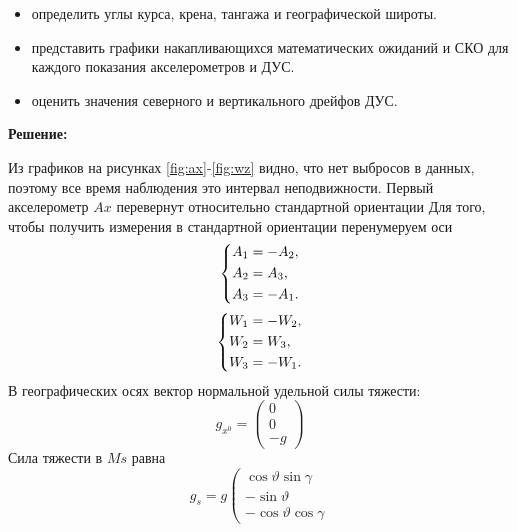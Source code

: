 \documentclass[a4paper,14pt]{article}
\theoremstyle{plain} %
\theoremstyle{definition} %
\theoremstyle{remark} %
\begin{document}
{\begin{itemize}
    \item определить углы курса, крена, тангажа и географической широты.

    \item представить графики накапливающихся математических ожиданий и СКО для каждого показания акселерометров и ДУС.

    \item оценить значения северного и вертикального дрейфов ДУС.

\end{itemize}
\newpage


\textbf{Решение:}


Из графиков на рисунках \eqref{fig:ax}-\eqref{fig:wz} видно,
что нет выбросов в данных, поэтому все время наблюдения это интервал неподвижности.
Первый акселерометр $Ax$ перевернут относительно стандартной ориентации
Для того, чтобы получить измерения в стандартной ориентации перенумеруем оси
\begin{equation}\label{aksel}
    \left\{ {\begin{aligned}
                 & A_1=-A_2 , \hfill \\
                 & A_2=A_3, \hfill   \\
                 & A_3=-A_1. \hfill  \\
            \end{aligned}} \right.
\end{equation}
\begin{equation}\label{dus}
    \left\{ {\begin{aligned}
                 & W_1=-W_2, \hfill \\
                 & W_2=W_3, \hfill  \\
                 & W_3=-W_1. \hfill \\
            \end{aligned}} \right.
\end{equation}
В географических осях вектор нормальной удельной силы тяжести:
$$
    g_{x^{0}}=\left(\begin{array}{r}
            0 \\
            0 \\
            -g
        \end{array}\right)
$$
Сила тяжести в $Ms$ равна
$$
    g_{s}=g\left(\begin{array}{c}
            \cos \vartheta \sin \gamma \\
            -\sin \vartheta            \\
            -\cos \vartheta \cos \gamma

\end{array}$$}
\end{document}
